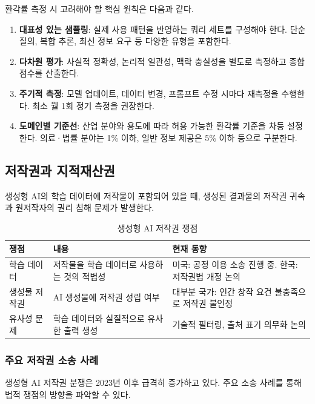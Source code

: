 환각률 측정 시 고려해야 할 핵심 원칙은 다음과 같다.

\begin{enumerate}
 \item \textbf{대표성 있는 샘플링}: 실제 사용 패턴을 반영하는 쿼리 세트를 구성해야 한다. 단순 질의, 복합 추론, 최신 정보 요구 등 다양한 유형을 포함한다.
 \item \textbf{다차원 평가}: 사실적 정확성, 논리적 일관성, 맥락 충실성을 별도로 측정하고 종합 점수를 산출한다.
 \item \textbf{주기적 측정}: 모델 업데이트, 데이터 변경, 프롬프트 수정 시마다 재측정을 수행한다. 최소 월 1회 정기 측정을 권장한다.
 \item \textbf{도메인별 기준선}: 산업 분야와 용도에 따라 허용 가능한 환각률 기준을 차등 설정한다. 의료·법률 분야는 1\% 이하, 일반 정보 제공은 5\% 이하 등으로 구분한다.
\end{enumerate}

\subsection{저작권과 지적재산권}
\label{sec:gen.1.2}

생성형 AI의 학습 데이터에 저작물이 포함되어 있을 때, 생성된 결과물의 저작권 귀속과 원저작자의 권리 침해 문제가 발생한다.

\begin{table}[htbp]
\centering
\caption{생성형 AI 저작권 쟁점}
\label{tab:gen_copyright}
\begin{tabularx}{\textwidth}{p{2.5cm}Xp{5cm}}
\toprule
\textbf{쟁점} & \textbf{내용} & \textbf{현재 동향} \\
\midrule
학습 데이터 & 저작물을 학습 데이터로 사용하는 것의 적법성 & 미국: 공정 이용 소송 진행 중. 한국: 저작권법 개정 논의 \\
생성물 저작권 & AI 생성물에 저작권 성립 여부 & 대부분 국가: 인간 창작 요건 불충족으로 저작권 불인정 \\
유사성 문제 & 학습 데이터와 실질적으로 유사한 출력 생성 & 기술적 필터링, 출처 표기 의무화 논의 \\
\bottomrule
\end{tabularx}
\end{table}

\subsubsection{주요 저작권 소송 사례}

생성형 AI 저작권 분쟁은 2023년 이후 급격히 증가하고 있다. 주요 소송 사례를 통해 법적 쟁점의 방향을 파악할 수 있다.

